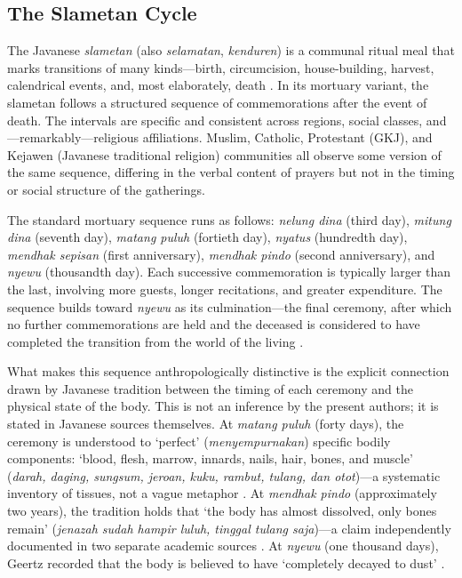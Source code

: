 \documentclass[12pt,a4paper]{article}
\begin{document}
\subsection{The Slametan Cycle}

The Javanese \textit{slametan} (also \textit{selamatan}, \textit{kenduren}) is a communal ritual meal that marks transitions of many kinds---birth, circumcision, house-building, harvest, calendrical events, and, most elaborately, death \citep{geertz_1960, beatty_1999}. In its mortuary variant, the slametan follows a structured sequence of commemorations after the event of death. The intervals are specific and consistent across regions, social classes, and---remarkably---religious affiliations. Muslim, Catholic, Protestant (GKJ), and Kejawen (Javanese traditional religion) communities all observe some version of the same sequence, differing in the verbal content of prayers but not in the timing or social structure of the gatherings.

The standard mortuary sequence runs as follows: \textit{nelung dina} (third day), \textit{mitung dina} (seventh day), \textit{matang puluh} (fortieth day), \textit{nyatus} (hundredth day), \textit{mendhak sepisan} (first anniversary), \textit{mendhak pindo} (second anniversary), and \textit{nyewu} (thousandth day). Each successive commemoration is typically larger than the last, involving more guests, longer recitations, and greater expenditure. The sequence builds toward \textit{nyewu} as its culmination---the final ceremony, after which no further commemorations are held and the deceased is considered to have completed the transition from the world of the living \citep{geertz_1960, koentjaraningrat_1994, hendrajaya_2020}.

What makes this sequence anthropologically distinctive is the explicit connection drawn by Javanese tradition between the timing of each ceremony and the physical state of the body. This is not an inference by the present authors; it is stated in Javanese sources themselves. At \textit{matang puluh} (forty days), the ceremony is understood to `perfect' (\textit{menyempurnakan}) specific bodily components: `blood, flesh, marrow, innards, nails, hair, bones, and muscle' (\textit{darah, daging, sungsum, jeroan, kuku, rambut, tulang, dan otot})---a systematic inventory of tissues, not a vague metaphor \citep[437]{hendrajaya_2020}. At \textit{mendhak pindo} (approximately two years), the tradition holds that `the body has almost dissolved, only bones remain' (\textit{jenazah sudah hampir luluh, tinggal tulang saja})---a claim independently documented in two separate academic sources \citep[439]{hendrajaya_2020, sholihah_2023}. At \textit{nyewu} (one thousand days), Geertz recorded that the body is believed to have `completely decayed to dust' \citep[ch.~6]{geertz_1960}.
\end{document}
